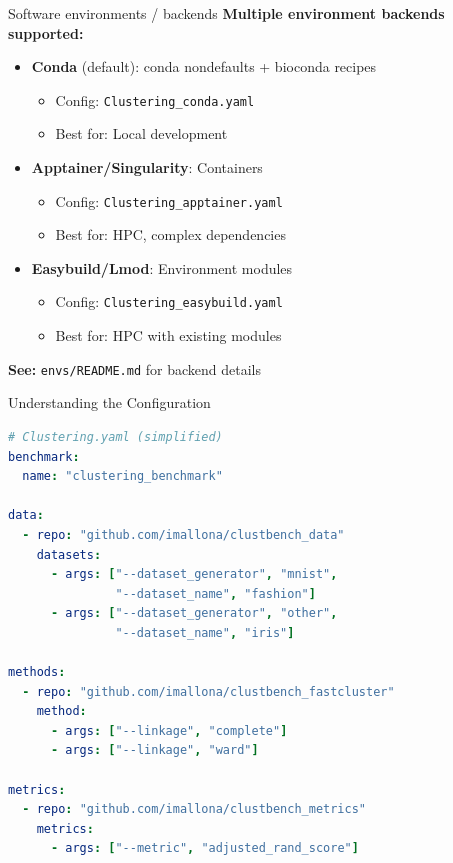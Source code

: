 \documentclass[aspectratio=169]{beamer}
\begin{document}
\begin{frame}{Software environments / backends}
    \textbf{Multiple environment backends supported:}
    
    \vspace{0.3cm}
    \begin{itemize}
        \item \textbf{Conda} (default): conda nondefaults + bioconda recipes
            \begin{itemize}
                \item Config: \texttt{Clustering\_conda.yaml}
                \item Best for: Local development
            \end{itemize}
        
        \item \textbf{Apptainer/Singularity}: Containers
            \begin{itemize}
                \item Config: \texttt{Clustering\_apptainer.yaml}
                \item Best for: HPC, complex dependencies
            \end{itemize}
        
        \item \textbf{Easybuild/Lmod}: Environment modules
            \begin{itemize}
                \item Config: \texttt{Clustering\_easybuild.yaml}
                \item Best for: HPC with existing modules
            \end{itemize}
    \end{itemize}
    
    \vspace{0.3cm}
    \textbf{See:} \texttt{envs/README.md} for backend details
\end{frame}

\begin{frame}[fragile]{Understanding the Configuration}
\begin{lstlisting}[language=yaml]
# Clustering.yaml (simplified)
benchmark:
  name: "clustering_benchmark"

data:
  - repo: "github.com/imallona/clustbench_data"
    datasets:
      - args: ["--dataset_generator", "mnist", 
               "--dataset_name", "fashion"]
      - args: ["--dataset_generator", "other",
               "--dataset_name", "iris"]

methods:
  - repo: "github.com/imallona/clustbench_fastcluster"
    method:
      - args: ["--linkage", "complete"]
      - args: ["--linkage", "ward"]

metrics:
  - repo: "github.com/imallona/clustbench_metrics"
    metrics:
      - args: ["--metric", "adjusted_rand_score"]
\end{lstlisting}
\end{frame}
\end{document}
